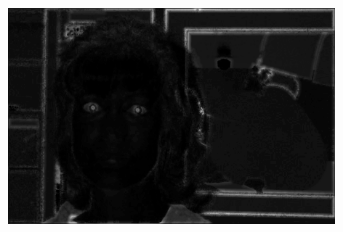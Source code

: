 \begin{figure}[H]
\begin{subfigure}{.33\textwidth}
  \includegraphics[width=0.95\textwidth]{img/fd/OriginalEyeMap.png}
  \caption{}
\end{subfigure}%


\end{figure}
